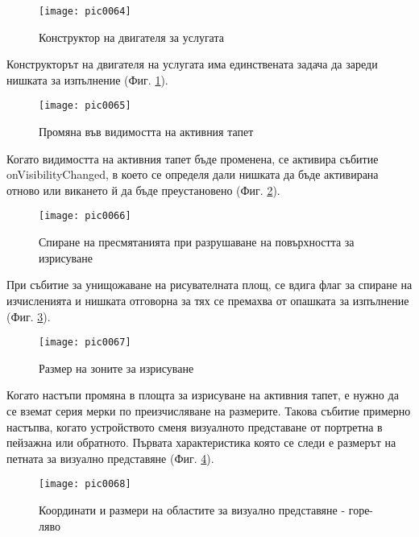 \begin{figure}[h]
  \centering
  \texttt{[image: pic0064]}
  \caption{Конструктор на двигателя за услугата}
\label{fig:pic0064}
\end{figure}
\FloatBarrier

Конструкторът на двигателя на услугата има единствената задача да зареди нишката за изпълнение (Фиг. \ref{fig:pic0064}).

\begin{figure}[h]
  \centering
  \texttt{[image: pic0065]}
  \caption{Промяна във видимостта на активния тапет}
\label{fig:pic0065}
\end{figure}
\FloatBarrier

Когато видимостта на активния тапет бъде променена, се активира събитие onVisibilityChanged, в което се определя дали нишката да бъде активирана отново или викането й да бъде преустановено (Фиг. \ref{fig:pic0065}).

\begin{figure}[h]
  \centering
  \texttt{[image: pic0066]}
  \caption{Спиране на пресмятанията при разрушаване на повърхността за изрисуване}
\label{fig:pic0066}
\end{figure}
\FloatBarrier

При събитие за унищожаване на рисувателната площ, се вдига флаг за спиране на изчисленията и нишката отговорна за тях се премахва от опашката за изпълнение (Фиг. \ref{fig:pic0066}).

\begin{figure}[h]
  \centering
  \texttt{[image: pic0067]}
  \caption{Размер на зоните за изрисуване}
\label{fig:pic0067}
\end{figure}
\FloatBarrier

Когато настъпи промяна в площта за изрисуване на активния тапет, е нужно да се вземат серия мерки по преизчисляване на размерите. Такова събитие примерно настъпва, когато устройството сменя визуалното представане от портретна в пейзажна или обратното. Първата характеристика която се следи е размерът на петната за визуално представяне (Фиг. \ref{fig:pic0067}).


\begin{figure}[h]
  \centering
  \texttt{[image: pic0068]}
  \caption{Координати и размери на областите за визуално представяне - горе-ляво}
\label{fig:pic0068}
\end{figure}
\FloatBarrier

